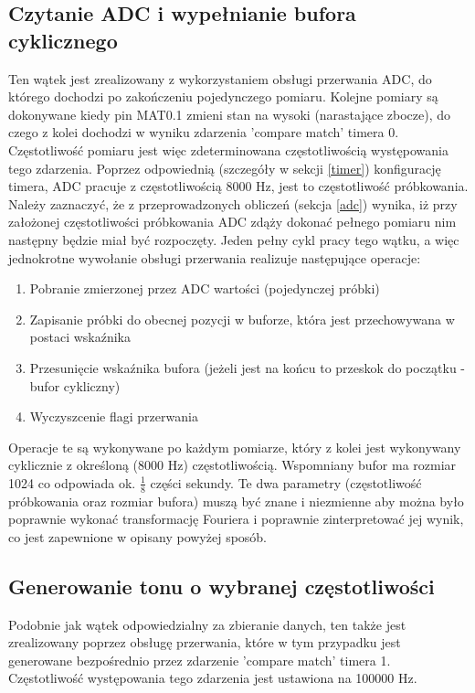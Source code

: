 \subsection{Czytanie ADC i wypełnianie bufora cyklicznego} \label{zasada_dzialania_watek_adc}
Ten wątek jest zrealizowany z wykorzystaniem obsługi przerwania ADC, do którego dochodzi po zakończeniu pojedynczego pomiaru. Kolejne pomiary są dokonywane kiedy pin MAT0.1 zmieni stan na wysoki (narastające zbocze), do czego z kolei dochodzi w wyniku zdarzenia 'compare match' timera 0. Częstotliwość pomiaru jest więc zdeterminowana częstotliwością występowania tego zdarzenia. Poprzez odpowiednią (szczegóły w sekcji \ref{timer}) konfigurację timera, ADC pracuje z częstotliwością 8000 Hz, jest to częstotliwość próbkowania. Należy zaznaczyć, że z przeprowadzonych obliczeń (sekcja \ref{adc}) wynika, iż przy założonej częstotliwości próbkowania ADC zdąży dokonać pełnego pomiaru nim następny będzie miał być rozpoczęty. Jeden pełny cykl pracy tego wątku, a więc jednokrotne wywołanie obsługi przerwania realizuje następujące operacje:
\begin{enumerate}
    \item Pobranie zmierzonej przez ADC wartości (pojedynczej próbki)
    \item Zapisanie próbki do obecnej pozycji w buforze, która jest przechowywana w postaci wskaźnika
    \item Przesunięcie wskaźnika bufora (jeżeli jest na końcu to przeskok do początku - bufor cykliczny)
    \item Wyczyszcenie flagi przerwania
\end{enumerate}
Operacje te są wykonywane po każdym pomiarze, który z kolei jest wykonywany cyklicznie z określoną (8000 Hz) częstotliwością. Wspomniany bufor ma rozmiar 1024 co odpowiada ok. $\frac{1}{8}$ części sekundy. Te dwa parametry (częstotliwość próbkowania oraz rozmiar bufora) muszą być znane i niezmienne aby można było poprawnie wykonać transformację Fouriera i poprawnie zinterpretować jej wynik, co jest zapewnione w opisany powyżej sposób.

\subsection{Generowanie tonu o wybranej częstotliwości} \label{zasada_dzialania_watek_dac}
Podobnie jak wątek odpowiedzialny za zbieranie danych, ten także jest zrealizowany poprzez obsługę przerwania, które w tym przypadku jest generowane bezpośrednio przez zdarzenie 'compare match' timera 1. Częstotliwość występowania tego zdarzenia jest ustawiona na 100000 Hz.

